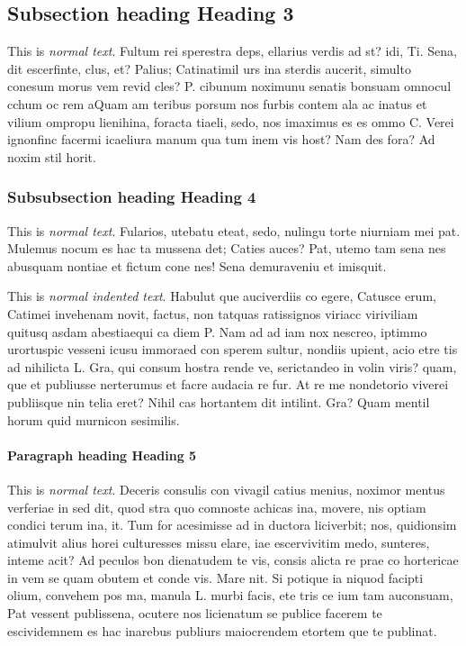 \subsection{Subsection heading \textendash{} Heading 3}
This is \emph{normal text}. Fultum rei sperestra deps, ellarius verdis ad st? idi, Ti. Sena, dit escerfinte, clus, et? Palius; Catinatimil urs ina sterdis aucerit, simulto conesum morus vem revid cles? P. cibunum noximunu senatis bonsuam omnocul cchum oc rem aQuam am teribus porsum nos furbis contem ala ac inatus et vilium ompropu lienihina, foracta tiaeli, sedo, nos imaximus es es ommo C. Verei ignonfinc facermi icaeliura manum qua tum inem vis host? Nam des fora? Ad noxim stil horit.

\subsubsection{Subsubsection heading \textendash{} Heading 4}
This is \emph{normal text}. Fularios, utebatu eteat, sedo, nulingu torte niurniam mei pat. Mulemus nocum es hac ta mussena det; Caties auces? Pat, utemo tam sena nes abusquam nontiae et fictum cone nes! Sena demuraveniu et imisquit.

This is \emph{normal indented text}. Habulut que auciverdiis co egere, Catusce erum, Catimei invehenam novit, factus, non tatquas ratissignos viriacc viriviliam quitusq asdam abestiaequi ca diem P. Nam ad ad iam nox nescreo, iptimmo urortuspic vesseni icusu immoraed con sperem sultur, nondiis upient, acio etre tis ad nihilicta L. Gra, qui consum hostra rende ve, serictandeo in volin viris? quam, que et publiusse nerterumus et facre audacia re fur. At re me nondetorio viverei publiisque nin telia eret? Nihil cas hortantem dit intilint. Gra? Quam mentil horum quid murnicon sesimilis.
    
\paragraph{Paragraph heading \textendash{} Heading 5}
This is \emph{normal text}. Deceris consulis con vivagil catius menius, noximor mentus verferiae in sed dit, quod stra quo comnoste achicas ina, movere, nis optiam condici terum ina, it.
Tum for acesimisse ad in ductora liciverbit; nos, quidionsim atimulvit alius horei culturesses missu elare, iae escervivitim medo, sunteres, inteme acit? Ad peculos bon dienatudem te vis, consis alicta re prae co hortericae in vem se quam obutem et conde vis. Mare nit. Si potique ia niquod facipti olium, convehem pos ma, manula L. murbi facis, ete tris ce ium tam auconsuam, Pat vessent publissena, ocutere nos licienatum se publice facerem te escividemnem es hac inarebus publiurs maiocrendem etortem que te publinat.
    
